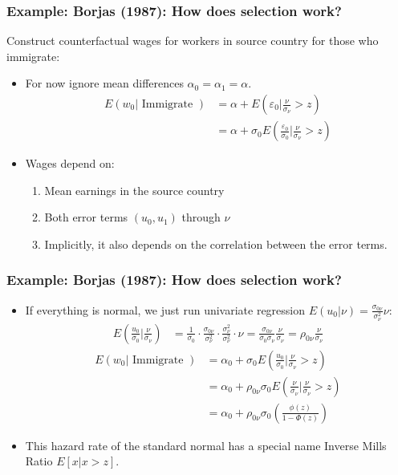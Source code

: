 \documentclass[xcolor=pdftex,dvipsnames,table,mathserif,aspectratio=169]{beamer}
\begin{document}
\begin{frame}
\frametitle{Example: Borjas (1987): How does selection work?}
Construct \alert{counterfactual wages} for workers in \alert{source} country for those who immigrate:
\begin{itemize}
\item For now ignore mean differences $\alpha_0 = \alpha_1 = \alpha$.
\begin{align*}
E\left(w_{0} | \text { Immigrate }\right) &=\alpha+E\left(\varepsilon_{0} | \frac{\nu}{\sigma_{\nu}}>z\right) \\
&=\alpha+\sigma_{0} E\left(\frac{\varepsilon_{0}}{\sigma_{0}} | \frac{\nu}{\sigma_{\nu}}>z\right)
\end{align*}
\item Wages depend on:
\begin{enumerate}
\item Mean earnings in the source country
\item Both error terms $\left(u_{0}, u_{1}\right)$ through $\nu$
\item Implicitly, it also depends on the correlation between the error terms.
\end{enumerate}
\end{itemize}
\end{frame}


\begin{frame}
\frametitle{Example: Borjas (1987): How does selection work?}
\begin{itemize}
\item If everything is normal, we just run univariate regression $E\left(u_{0} | \nu\right)=\frac{\sigma_{0 \nu}}{\sigma_{\nu}^{2}} \nu$:
\begin{align*}
E\left(\frac{u_{0}}{\sigma_{0}} | \frac{\nu}{\sigma_{\nu}}\right) &= \frac{1}{\sigma_{0}}\cdot \frac{\sigma_{0 \nu}}{\sigma_{\nu}^{2}} \cdot \frac{\sigma_{\nu}^{2}}{\sigma_{\nu}^{2}} \cdot \nu  
=\frac{\sigma_{0 \nu}}{\sigma_{0} \sigma_{\nu}} \frac{\nu}{\sigma_{\nu}}  =\rho_{0 \nu} \frac{\nu}{\sigma_{\nu}} 
\end{align*}
\begin{align*}
E\left(w_{0} | \text { Immigrate }\right) 
&=\alpha_{0}+\sigma_{0} E\left(\frac{u_{0}}{\sigma_{0}} | \frac{\nu}{\sigma_{\nu}}>z\right) \\
 &=\alpha_{0}+\rho_{0 \nu} \sigma_{0} E\left(\frac{\nu}{\sigma_{\nu}} | \frac{\nu}{\sigma_{\nu}}>z\right) \\
  &=\alpha_{0}+\rho_{0 \nu} \sigma_{0}\left(\frac{\phi(z)}{1-\Phi(z)}\right) 
\end{align*}
\item This hazard rate of the standard normal has a special name \alert{Inverse Mills Ratio} $E[x | x > z]$.
\end{itemize}
\end{frame}
\end{document}
